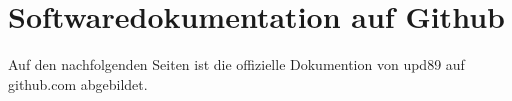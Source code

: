 \chapter{Softwaredokumentation auf Github}
Auf den nachfolgenden Seiten ist die offizielle Dokumention von upd89 auf github.com abgebildet.



